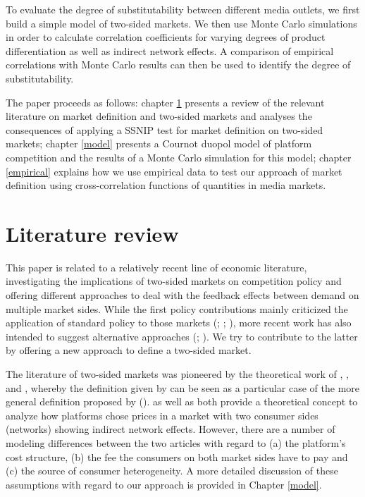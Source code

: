 \documentclass[12pt,a4paper,notitlepage]{article}
\begin{document}
To evaluate the degree of substitutability between different media outlets, we first build a simple model of two-sided markets. We then use Monte Carlo simulations in order to calculate correlation coefficients for varying degrees of product differentiation as well as indirect network effects. A comparison of empirical correlations with Monte Carlo results can then be used to identify the degree of substitutability. 




The paper proceeds as follows: chapter \ref{litrev} presents a review of the relevant literature on market definition and two-sided markets and analyses the consequences of applying a SSNIP test for market definition on two-sided markets; chapter \ref{model} presents a Cournot duopol model of platform competition and the results of a Monte Carlo simulation for this model; chapter \ref{empirical}  explains how we use empirical data to test our approach of market definition using cross-correlation functions of quantities in media markets.  





\section{Literature review}\label{litrev}
This paper is related to a relatively recent line of economic literature, investigating the implications of two-sided markets on competition policy and offering different approaches to deal with the feedback effects between demand on multiple market sides. While the first policy contributions mainly criticized the application of standard policy to those markets (\cite{wright_one-sided_2004}; \cite{leonello_horizontal_2010}; \cite{chandra_mergers_2009}), more recent work has also intended to suggest alternative approaches (\cite{argentesi_estimating_2007}; \cite{song_estimating_2015}). We try to contribute to the latter by offering a new approach to define a two-sided market. 

The literature of two-sided markets was pioneered by the theoretical work of \cite{caillaud_chicken_2003}, \cite{rochet_platform_2003}, \cite{evans_antitrust_2003} and \cite{armstrong_competition_2006}, whereby the definition given by \cite{evans_antitrust_2003} can be seen as a particular case of the more general definition proposed by \cite{rochet_platform_2003} (\cite{filistrucchi_identifying_2012}). \cite{rochet_platform_2003} as well as \cite{armstrong_competition_2006} both provide a theoretical concept to analyze how platforms chose prices in a market with two consumer sides (networks) showing indirect network effects. However, there are a number of modeling differences between the two articles with regard to (a) the platform's cost structure, (b) the fee the consumers on both market sides have to pay and (c) the source of consumer heterogeneity. A more detailed discussion of these assumptions with regard to our approach is provided in Chapter \ref{model}.  
\end{document}
